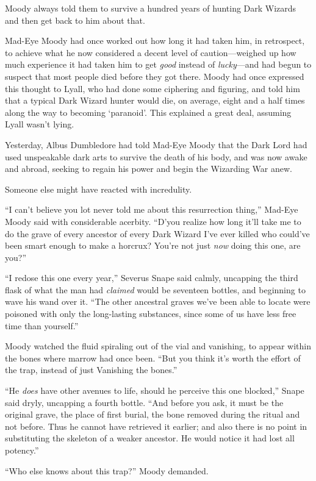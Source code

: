 Moody always told them to survive a hundred years of hunting Dark Wizards and then get back to him about that.

Mad-Eye Moody had once worked out how long it had taken him, in retrospect, to achieve what he now considered a decent level of caution—weighed up how much experience it had taken him to get \emph{good} instead of \emph{lucky}—and had begun to suspect that most people died before they got there. Moody had once expressed this thought to Lyall, who had done some ciphering and figuring, and told him that a typical Dark Wizard hunter would die, on average, eight and a half times along the way to becoming ‘paranoid’. This explained a great deal, assuming Lyall wasn’t lying.

Yesterday, Albus Dumbledore had told Mad-Eye Moody that the Dark Lord had used unspeakable dark arts to survive the death of his body, and was now awake and abroad, seeking to regain his power and begin the Wizarding War anew.

Someone else might have reacted with incredulity.

“I can’t believe you lot never told me about this resurrection thing,” Mad-Eye Moody said with considerable acerbity. “D’you realize how long it’ll take me to do the grave of every ancestor of every Dark Wizard I’ve ever killed who could’ve been smart enough to make a horcrux? You’re not just \emph{now} doing this one, are you?”

“I redose this one every year,” Severus Snape said calmly, uncapping the third flask of what the man had \emph{claimed} would be seventeen bottles, and beginning to wave his wand over it. “The other ancestral graves we’ve been able to locate were poisoned with only the long-lasting substances, since some of us have less free time than yourself.”

Moody watched the fluid spiraling out of the vial and vanishing, to appear within the bones where marrow had once been. “But you think it’s worth the effort of the trap, instead of just Vanishing the bones.”

“He \emph{does} have other avenues to life, should he perceive this one blocked,” Snape said dryly, uncapping a fourth bottle. “And before you ask, it must be the original grave, the place of first burial, the bone removed during the ritual and not before. Thus he cannot have retrieved it earlier; and also there is no point in substituting the skeleton of a weaker ancestor. He would notice it had lost all potency.”

“Who else knows about this trap?” Moody demanded.

